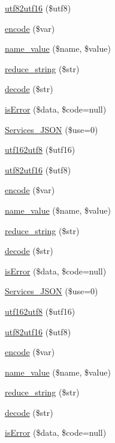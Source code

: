 \begin{DoxyCompactItemize}
\hyperlink{class_services___j_s_o_n_af9687bbf6bcddc9c847d608f9a1fa4c0}{utf82utf16} (\$utf8)
\item 
\hyperlink{class_services___j_s_o_n_acdf1c85111e34b3048d436228bf39819}{encode} (\$var)
\item 
\hyperlink{class_services___j_s_o_n_aa7f3e18209717e584f01f53a0325e9ff}{name\-\_\-value} (\$name, \$value)
\item 
\hyperlink{class_services___j_s_o_n_ae463a3baa44e95fa5b5151ab2334df1c}{reduce\-\_\-string} (\$str)
\item 
\hyperlink{class_services___j_s_o_n_a4afbb486f4a5ff5a8170c832f5997986}{decode} (\$str)
\item 
\hyperlink{class_services___j_s_o_n_a55ae0955466c3970507b122f3f5d1b38}{is\-Error} (\$data, \$code=null)
\item 
\hyperlink{class_services___j_s_o_n_abc84bd855fe129a4c68bcb68b4d17108}{Services\-\_\-\-J\-S\-O\-N} (\$use=0)
\item 
\hyperlink{class_services___j_s_o_n_aa7b1b36cd3a4995bbb60f5def6a216e2}{utf162utf8} (\$utf16)
\item 
\hyperlink{class_services___j_s_o_n_af9687bbf6bcddc9c847d608f9a1fa4c0}{utf82utf16} (\$utf8)
\item 
\hyperlink{class_services___j_s_o_n_acdf1c85111e34b3048d436228bf39819}{encode} (\$var)
\item 
\hyperlink{class_services___j_s_o_n_aa7f3e18209717e584f01f53a0325e9ff}{name\-\_\-value} (\$name, \$value)
\item 
\hyperlink{class_services___j_s_o_n_ae463a3baa44e95fa5b5151ab2334df1c}{reduce\-\_\-string} (\$str)
\item 
\hyperlink{class_services___j_s_o_n_a4afbb486f4a5ff5a8170c832f5997986}{decode} (\$str)
\item 
\hyperlink{class_services___j_s_o_n_a55ae0955466c3970507b122f3f5d1b38}{is\-Error} (\$data, \$code=null)
\item 
\hyperlink{class_services___j_s_o_n_abc84bd855fe129a4c68bcb68b4d17108}{Services\-\_\-\-J\-S\-O\-N} (\$use=0)
\item 
\hyperlink{class_services___j_s_o_n_aa7b1b36cd3a4995bbb60f5def6a216e2}{utf162utf8} (\$utf16)
\item 
\hyperlink{class_services___j_s_o_n_af9687bbf6bcddc9c847d608f9a1fa4c0}{utf82utf16} (\$utf8)
\item 
\hyperlink{class_services___j_s_o_n_acdf1c85111e34b3048d436228bf39819}{encode} (\$var)
\item 
\hyperlink{class_services___j_s_o_n_aa7f3e18209717e584f01f53a0325e9ff}{name\-\_\-value} (\$name, \$value)
\item 
\hyperlink{class_services___j_s_o_n_ae463a3baa44e95fa5b5151ab2334df1c}{reduce\-\_\-string} (\$str)
\item 
\hyperlink{class_services___j_s_o_n_a4afbb486f4a5ff5a8170c832f5997986}{decode} (\$str)
\item 
\hyperlink{class_services___j_s_o_n_a55ae0955466c3970507b122f3f5d1b38}{is\-Error} (\$data, \$code=null)
\end{DoxyCompactItemize}


